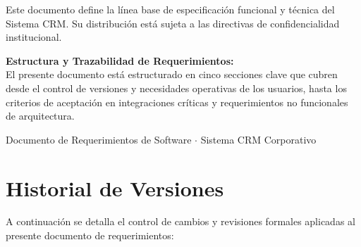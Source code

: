 \documentclass[11pt,a4paper]{article}
\begin{document}
\begin{titlepage}
\begin{flushleft}
\begin{minipage}{0.88\textwidth}
            \vfill
            
            {\small\sffamily\textcolor{MutedText}{
                Este documento define la línea base de especificación funcional y técnica del Sistema CRM.
                Su distribución está sujeta a las directivas de confidencialidad institucional.
            }}
        \end{minipage}
    \end{flushleft}
\end{titlepage}
\hypersetup{pageanchor=true}

\newpage
{}

\vspace*{0.5cm}
{
    \hypersetup{linkcolor=PrimaryNavy}
    \tableofcontents
}

\vfill

\begin{tcolorbox}[
    enhanced,
    colback=BgSoftGray,
    colframe=BorderGray,
    boxrule=0.8pt,
    arc=2mm,
    left=12pt,
    right=12pt,
    top=8pt,
    bottom=8pt
]
    \sffamily\small
    \textcolor{PrimaryNavy}{\textbf{Estructura y Trazabilidad de Requerimientos:}}\\
    El presente documento está estructurado en cinco secciones clave que cubren desde el control de versiones y necesidades operativas de los usuarios, hasta los criterios de aceptación en integraciones críticas y requerimientos no funcionales de arquitectura.
\end{tcolorbox}

\vspace{0.4cm}
\begin{center}
    \small\sffamily\textcolor{MutedText}{Documento de Requerimientos de Software $\cdot$ Sistema CRM Corporativo}
\end{center}

\newpage
{}

\section{Historial de Versiones}

A continuación se detalla el control de cambios y revisiones formales aplicadas al presente documento de requerimientos:
\end{document}

